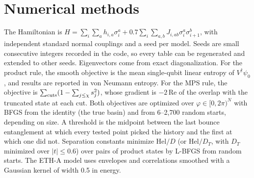 \documentclass[11pt]{article}
\theoremstyle{definition}
\theoremstyle{remark}
\newcommand{\Hel}{\mathrm{Hel}}
\begin{document}
\section{Numerical methods}
\label{app:numerics}

The Hamiltonian is $H=\sum_i\sum_a h_{i,a}\sigma^a_i+0.7\sum_i\sum_{a,b}J_{i,ab}\sigma^a_i\sigma^b_{i+1}$, with independent standard normal couplings and a seed per model. Seeds are small consecutive integers recorded in the code, so every table can be regenerated and extended to other seeds. Eigenvectors come from exact diagonalization. For the product rule, the smooth objective is the mean single-qubit linear entropy of $V^\dagger\psi_0$, and results are reported in von Neumann entropy. For the MPS rule, the objective is $\sum_{\rm cuts}(1-\sum_{j\le\chi}s_j^2)$, whose gradient is $-2\,\mathrm{Re}$ of the overlap with the truncated state at each cut. Both objectives are optimized over $\varphi\in[0,2\pi)^N$ with BFGS from the identity (the true basin) and from 6--2{,}700 random starts, depending on size. A threshold is the midpoint between the last bounce entanglement at which every tested point picked the history and the first at which one did not. Separation constants minimize $\Hel/D$ (or $\Hel/D_T$, with $D_T$ minimized over $|t|\le0.6$) over pairs of product states by L-BFGS from random starts. The ETH-A model uses envelopes and correlations smoothed with a Gaussian kernel of width 0.5 in energy.
\end{document}
